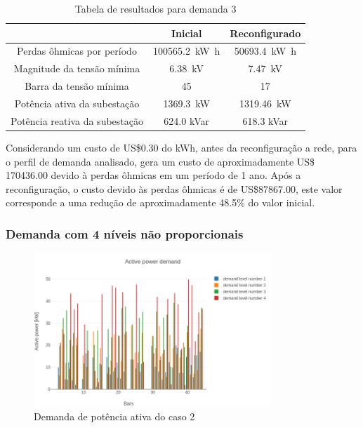 \begin{table}[H]
    \centering
    \caption{Tabela de resultados para demanda 3}
    \begin{tabular}{|c|c|c|}
    \hline
                                   & Inicial              & Reconfigurado               \\\hline
    Perdas ôhmicas por período       & \SI{100565.2}{\kilo\watt\hour}      & \SI{50693.4}{\kilo\watt\hour}  \\\hline
    Magnitude da tensão mínima     & \SI{6.38}{\kilo\volt}    & \SI{7.47}{\kilo\volt}   \\\hline
    Barra da tensão mínima         & 45                       & 17                      \\\hline
    Potência ativa da subestação   & \SI{1369.3}{\kilo\watt} & \SI{1319.46}{\kilo\watt}\\\hline
    Potência reativa da subestação & 624.0 kVar              & 618.3 kVar      \\\hline
    \end{tabular}
    \label{tab:45prop3}
\end{table}


Considerando um custo de US\$0.30 do kWh, antes da reconfiguração a rede, para o perfil de demanda analisado, gera um custo de aproximadamente US\$ 170436.00 devido à perdas ôhmicas em um período de 1 ano.
Após a reconfiguração, o custo devido às perdas ôhmicas é de US\$87867.00, este valor corresponde a uma redução de aproximadamente 48.5\% do valor inicial.

\subsubsection{Demanda com 4 níveis não proporcionais}

\begin{figure}[H]
    \centering
    \includegraphics[width=0.8\textwidth]{7_Results/img/active_demand.png}
    \caption{Demanda de potência ativa do caso 2}
    \label{fig:45activepower2}
\end{figure}

